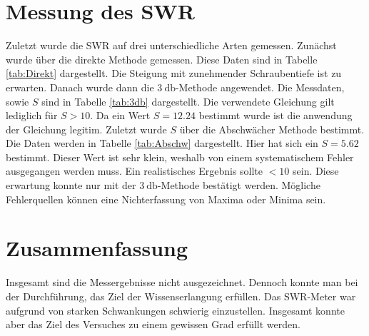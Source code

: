 \section{Messung des SWR}
Zuletzt wurde die SWR auf drei unterschiedliche Arten gemessen. Zunächst wurde über die direkte Methode gemessen. Diese Daten sind in Tabelle \ref{tab:Direkt} dargestellt. Die Steigung
mit zunehmender Schraubentiefe ist zu erwarten. Danach wurde dann die $\qty{3}{\decibel}$-Methode angewendet. Die Messdaten, sowie $S$ sind in Tabelle \ref{tab:3db} dargestellt. Die
verwendete Gleichung gilt lediglich für $S>10$. Da ein Wert $S = \num{12.24}$ bestimmt wurde ist die anwendung der Gleichung legitim. 
Zuletzt wurde $S$ über die Abschwächer Methode bestimmt. Die Daten werden in Tabelle \ref{tab:Abschw} dargestellt. Hier hat sich ein $S = \num{5.62}$ bestimmt. Dieser Wert ist sehr 
klein, weshalb von einem systematischem Fehler ausgegangen werden muss. Ein realistisches Ergebnis sollte $< 10$ sein. Diese erwartung konnte nur mit der $\qty{3}{\decibel}$-Methode
bestätigt werden. Mögliche Fehlerquellen können eine Nichterfassung von Maxima oder Minima sein.
\section{Zusammenfassung}
Insgesamt sind die Messergebnisse nicht ausgezeichnet. Dennoch konnte man bei der Durchführung, das Ziel der Wissenserlangung erfüllen. Das SWR-Meter war aufgrund von starken
Schwankungen schwierig einzustellen. Insgesamt konnte aber das Ziel des Versuches zu einem gewissen Grad erfüllt werden. 

